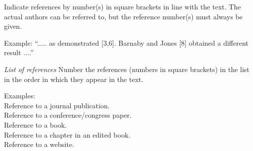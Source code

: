 \documentclass[twocolumn, 10pt]{article}
\begin{document}
Indicate references by number(s) in square brackets in line with the text. The actual authors can be referred to, but the reference number(s) must always be given.

Example: “..... as demonstrated [3,6]. Barnaby and Jones [8] obtained a different result ....”

\noindent\textit{List of references}
Number the references (numbers in square brackets) in the list in the order in which they appear in the text.

Examples:\\
Reference to a journal publication\cite{art}.\\
Reference to a conference/congress paper\cite{conf}.\\
Reference to a book\cite{book}.\\
Reference to a chapter in an edited book\cite{chap}.\\
Reference to a website\cite{web}.




\end{document}
